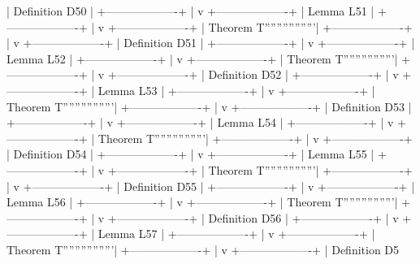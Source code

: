 | Definition D50    |
+-------------------+
        |
        v
+-------------------+
| Lemma L51         |
+-------------------+
        |
        v
+-------------------+
| Theorem T'''''''''''''''''|
+-------------------+
        |
        v
+-------------------+
| Definition D51    |
+-------------------+
        |
        v
+-------------------+
| Lemma L52         |
+-------------------+
        |
        v
+-------------------+
| Theorem T'''''''''''''''''|
+-------------------+
        |
        v
+-------------------+
| Definition D52    |
+-------------------+
        |
        v
+-------------------+
| Lemma L53         |
+-------------------+
        |
        v
+-------------------+
| Theorem T'''''''''''''''''|
+-------------------+
        |
        v
+-------------------+
| Definition D53    |
+-------------------+
        |
        v
+-------------------+
| Lemma L54         |
+-------------------+
        |
        v
+-------------------+
| Theorem T'''''''''''''''''|
+-------------------+
        |
        v
+-------------------+
| Definition D54    |
+-------------------+
        |
        v
+-------------------+
| Lemma L55         |
+-------------------+
        |
        v
+-------------------+
| Theorem T'''''''''''''''''|
+-------------------+
        |
        v
+-------------------+
| Definition D55    |
+-------------------+
        |
        v
+-------------------+
| Lemma L56         |
+-------------------+
        |
        v
+-------------------+
| Theorem T'''''''''''''''''|
+-------------------+
        |
        v
+-------------------+
| Definition D56    |
+-------------------+
        |
        v
+-------------------+
| Lemma L57         |
+-------------------+
        |
        v
+-------------------+
| Theorem T'''''''''''''''''|
+-------------------+
        |
        v
+-------------------+
| Definition D5